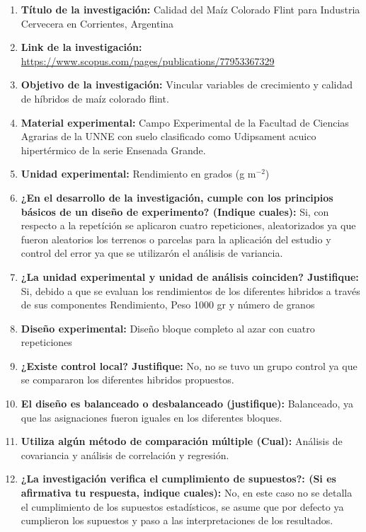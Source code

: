 \begin{enumerate}
	\item \textbf{Título de la investigación:} Calidad del Maíz Colorado Flint para Industria Cervecera en Corrientes, Argentina
	\item \textbf{Link de la investigación:} \url{https://www.scopus.com/pages/publications/77953367329}
	\item \textbf{Objetivo de la investigación:} Vincular variables de crecimiento y calidad de híbridos de maíz colorado flint.
	\item \textbf{Material experimental:} Campo Experimental de la Facultad de Ciencias Agrarias de la UNNE con suelo clasificado como Udipsament acuico hipertérmico de la serie Ensenada Grande.
	\item \textbf{Unidad experimental:} Rendimiento en grados (g m$^{-2}$)
	\item \textbf{¿En el desarrollo de la investigación, cumple con los principios básicos de un diseño de experimento? (Indique cuales):} Si, con respecto a la repetíción se aplicaron cuatro repeticiones, aleatorizados ya que fueron aleatorios los terrenos o parcelas para la aplicación del estudio y control del error ya que se utilizarón el análisis de variancia.
	\item \textbf{¿La unidad experimental y unidad de análisis coinciden? Justifique:} Si, debido a que se evaluan los rendimientos de los diferentes hibridos a través de sus componentes Rendimiento, Peso 1000 gr y número de granos
	\item \textbf{Diseño experimental:} Diseño bloque completo al azar con cuatro repeticiones
	\item \textbf{¿Existe control local? Justifique:} No, no se tuvo un grupo control ya que se compararon los diferentes hibridos propuestos.
	\item \textbf{El diseño es balanceado o desbalanceado (justifique):} Balanceado, ya que las asignaciones fueron iguales en los diferentes bloques.
	\item \textbf{Utiliza algún método de comparación múltiple (Cual):} Análisis de covariancia y análisis de correlación y regresión.
	\item \textbf{¿La investigación verifica el cumplimiento de supuestos?: (Si es afirmativa tu respuesta, indique cuales):} No, en este caso no se detalla el cumplimiento de los supuestos estadísticos, se asume que por defecto ya cumplieron los supuestos y paso a las interpretaciones de los resultados.
\end{enumerate}

